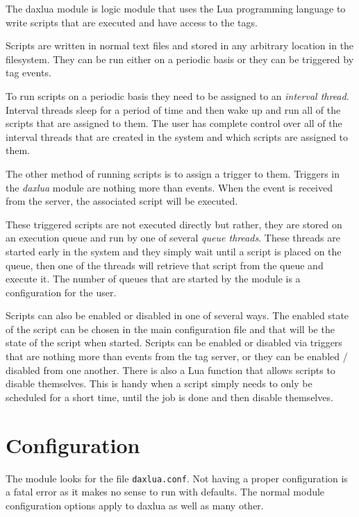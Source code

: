 The daxlua module is logic module that uses the Lua programming language to
write scripts that are executed and have access to the \opendax tags.

Scripts are written in normal text files and stored in any arbitrary location in
the filesystem.  They can be run either on a periodic basis or they can be triggered
by tag events.

To run scripts on a periodic basis they need to be assigned to an \textit{interval thread}.
Interval threads sleep for a period of time and then wake up and run all of the scripts
that are assigned to them.  The user has complete control over all of the interval threads
that are created in the system and which scripts are assigned to them.

The other method of running scripts is to assign a trigger to them.  Triggers in the \textit{daxlua}
module are nothing more than \opendax events.  When the event is received from the server,
the associated script will be executed.

These triggered scripts are not executed directly but rather, they are stored on an execution
queue and run by one of several \textit{queue threads}.  These threads are started early in the system
and they simply wait until a script is placed on the queue, then one of the threads will retrieve that
script from the queue and execute it.  The number of queues that are started by the module is a
configuration for the user.

Scripts can also be enabled or disabled in one of several ways.  The enabled state of the script can
be chosen in the main configuration file and that will be the state of the script when started.  Scripts
can be enabled or disabled via triggers that are nothing more than \opendax events from the tag server, or
they can be enabled / disabled from one another.  There is also a Lua function that allows scripts
to disable themselves.  This is handy when a script simply needs to only be scheduled for a short time, until
the job is done and then disable themselves.

\section{Configuration}

The module looks for the file \texttt{daxlua.conf}.  Not having a proper configuration is a fatal error
as it makes no sense to run with defaults.  The normal module configuration options apply to daxlua
as well as many other.

